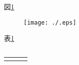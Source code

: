 \documentclass{jsarticle}
\begin{document}



図\ref{figure:}

\begin{figure}[ht]
\begin{center}
\texttt{[image: ./.eps]}
\caption{}
\label{figure:}
\end{center}
\end{figure}


表\ref{table:}

\begin{table}[ht]
\caption{}
\label{table:}
\begin{center}
\begin{tabular}{c|cc}
\hline
\hline
 & & \\
\hline
 & & \\
\end{tabular}
\end{center}
\end{table}



\cite{}




\nocite{*}



\cite{}

\begin{thebibliography}{999}
\bibitem{}
\end{thebibliography}
\end{document}
